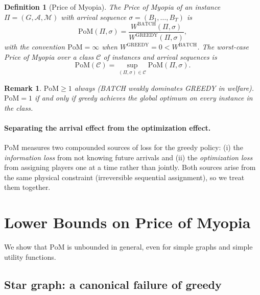 \documentclass[11pt]{article}
\newtheorem{definition}{Definition}
\newtheorem{remark}{Remark}
\newcommand{\GREEDY}{\mathrm{GREEDY}}
\newcommand{\BATCH}{\mathrm{BATCH}}
\newcommand{\PoM}{\mathrm{PoM}}
\newcommand{\A}{\mathcal{A}}
\begin{document}
\begin{definition}[Price of Myopia]
  \label{def:pom}
  The \emph{Price of Myopia} of an instance $\Pi = (G, \A, \mathcal{M})$ with arrival
  sequence $\sigma = (B_1, \ldots, B_T)$ is
  \begin{equation}
    \PoM(\Pi, \sigma) = \frac{W^{\BATCH}(\Pi, \sigma)}{W^{\GREEDY}(\Pi, \sigma)},
  \end{equation}
  with the convention $\PoM = \infty$ when $W^{\GREEDY} = 0 < W^{\BATCH}$.
  The \emph{worst-case Price of Myopia} over a class $\mathcal{C}$ of instances and
  arrival sequences is
  \begin{equation}
    \PoM(\mathcal{C}) = \sup_{(\Pi,\sigma)\in\mathcal{C}} \PoM(\Pi,\sigma).
  \end{equation}
\end{definition}

\begin{remark}
  $\PoM \geq 1$ always (BATCH weakly dominates GREEDY in welfare).
  $\PoM = 1$ if and only if greedy achieves the global optimum on every instance in
  the class.
\end{remark}

\paragraph{Separating the arrival effect from the optimization effect.}
$\PoM$ measures two compounded sources of loss for the greedy policy: (i) the
\emph{information loss} from not knowing future arrivals and (ii) the
\emph{optimization loss} from assigning players one at a time rather than jointly.
Both sources arise from the same physical constraint (irreversible sequential
assignment), so we treat them together.

\section{Lower Bounds on Price of Myopia}
\label{sec:lower}

We show that $\PoM$ is unbounded in general, even for simple graphs and simple
utility functions.

\subsection{Star graph: a canonical failure of greedy}
\end{document}
